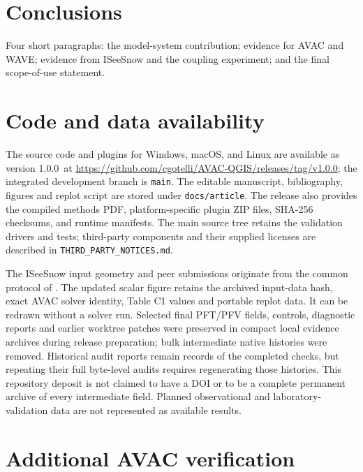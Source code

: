 \documentclass[11pt,a4paper]{article}
\newcommand{\codepath}[1]{\texttt{#1}}
\newcommand{\modelversion}{1.0.0}
\begin{document}
\newpage
\section{Conclusions}
\label{sec:conclusions}

Four short paragraphs: the model-system contribution; evidence for AVAC
and WAVE; evidence from ISeeSnow and the coupling experiment; and the final
scope-of-use statement.


\section{Code and data availability}
\label{sec:code-data}

The source code and plugins for Windows, macOS, and Linux are available as
version \modelversion\
at \url{https://github.com/cgotelli/AVAC-QGIS/releases/tag/v1.0.0}; the
integrated development branch is \texttt{main}. The editable manuscript,
bibliography, figures and replot script are stored under
\codepath{docs/article}. The release also provides the compiled methods PDF,
platform-specific plugin ZIP files, SHA-256 checksums, and runtime manifests.
The main source tree retains the validation drivers and tests;
third-party components and their supplied licenses are described in
\codepath{THIRD\_PARTY\_NOTICES.md}.

The ISeeSnow input geometry and peer submissions originate from the common
protocol of \citet{WirbelEtAl2026}. The updated scalar figure retains the
archived input-data hash, exact AVAC solver identity, Table C1 values and
portable replot data. It can be redrawn without a solver run. Selected final
PFT/PFV fields, controls, diagnostic reports and earlier worktree patches were
preserved in compact local evidence archives during release preparation;
bulk intermediate native histories were removed. Historical audit reports
remain records of the completed checks, but repeating their full byte-level
audits requires regenerating those histories. This repository deposit is not
claimed to have a DOI or to be a complete permanent archive of every
intermediate field. Planned observational and laboratory-validation data are
not represented as available results.

\newpage
\appendix

\section{Additional AVAC verification}
\label{app:avac-verification}
\end{document}
